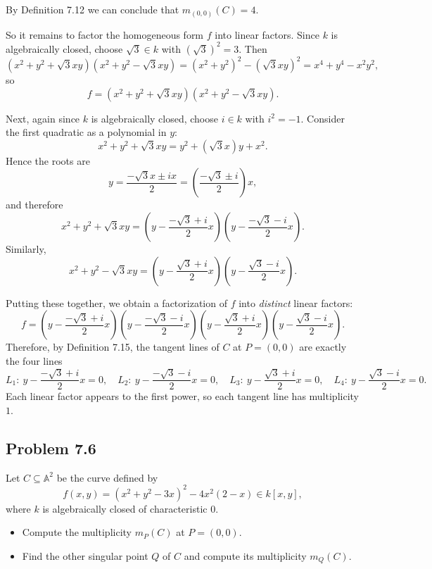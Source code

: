 \documentclass[a4paper,12pt,openany]{article}
\theoremstyle{plain}
\theoremstyle{definition}
\theoremstyle{remark}
\begin{document}
By Definition 7.12  we can conclude that $m_{(0,0)}(C)=4$.

So it remains to factor the homogeneous form $f$ into linear factors.
Since $k$ is algebraically closed, choose $\sqrt{3}\in k$ with $(\sqrt{3})^{2}=3$. Then
\[
(x^{2}+y^{2}+\sqrt{3}xy)(x^{2}+y^{2}-\sqrt{3}xy)
=(x^{2}+y^{2})^{2}-(\sqrt{3}xy)^{2}
=x^{4}+y^{4}-x^{2}y^{2},
\]
so
\[
f=(x^{2}+y^{2}+\sqrt{3}xy)(x^{2}+y^{2}-\sqrt{3}xy).
\]

Next, again since $k$ is algebraically closed, choose $i\in k$ with $i^{2}=-1$.
Consider the first quadratic as a polynomial in $y$:
\[
x^{2}+y^{2}+\sqrt{3}xy = y^{2}+(\sqrt{3}x)y+x^{2}.
\]
Hence the roots are
\[
y=\frac{-\sqrt{3}x\pm ix}{2}=\left(\frac{-\sqrt{3}\pm i}{2}\right)x,
\]
and therefore
\[
x^{2}+y^{2}+\sqrt{3}xy
=
\left(y-\frac{-\sqrt{3}+i}{2}x\right)\left(y-\frac{-\sqrt{3}-i}{2}x\right).
\]
Similarly,
\[
x^{2}+y^{2}-\sqrt{3}xy
=
\left(y-\frac{\sqrt{3}+i}{2}x\right)\left(y-\frac{\sqrt{3}-i}{2}x\right).
\]

Putting these together, we obtain a factorization of $f$ into \emph{distinct} linear factors:
\[
f
=
\left(y-\frac{-\sqrt{3}+i}{2}x\right)
\left(y-\frac{-\sqrt{3}-i}{2}x\right)
\left(y-\frac{\sqrt{3}+i}{2}x\right)
\left(y-\frac{\sqrt{3}-i}{2}x\right).
\]
Therefore, by Definition 7.15, the tangent lines of $C$ at $P=(0,0)$ are exactly the four lines
\[
L_1:\ y-\frac{-\sqrt{3}+i}{2}x=0,\quad
L_2:\ y-\frac{-\sqrt{3}-i}{2}x=0,\quad
L_3:\ y-\frac{\sqrt{3}+i}{2}x=0,\quad
L_4:\ y-\frac{\sqrt{3}-i}{2}x=0.
\]
Each linear factor appears to the first power, so each tangent line has multiplicity $1$.

\medskip

\subsection*{Problem 7.6}

Let $C\subseteq \mathbb{A}^{2}$ be the curve defined by
\[
f(x,y)=(x^{2}+y^{2}-3x)^{2}-4x^{2}(2-x)\in k[x,y],
\]
where $k$ is algebraically closed of characteristic $0$.

\begin{itemize}
\item[(a)] Compute the multiplicity $m_{P}(C)$ at $P=(0,0)$.
\item[(b)] Find the other singular point $Q$ of $C$ and compute its multiplicity $m_{Q}(C)$.
\end{itemize}

\medskip
\end{document}
